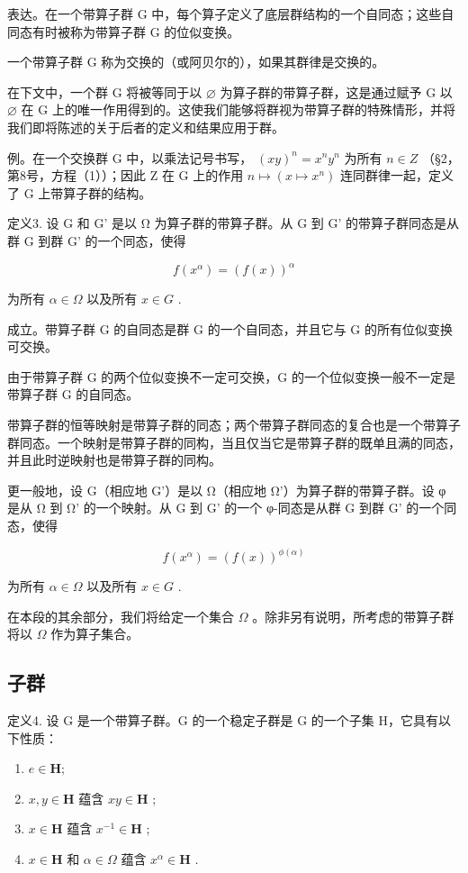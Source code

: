 表达。在一个带算子群 G 中，每个算子定义了底层群结构的一个自同态；这些自同态有时被称为带算子群 G 的位似变换。

一个带算子群 G 称为交换的（或阿贝尔的），如果其群律是交换的。

在下文中，一个群 G 将被等同于以 \(\varnothing\) 为算子群的带算子群，这是通过赋予 G 以 \(\varnothing\) 在 G 上的唯一作用得到的。这使我们能够将群视为带算子群的特殊情形，并将我们即将陈述的关于后者的定义和结果应用于群。

例。在一个交换群 G 中，以乘法记号书写， \((xy)^{n} = x^{n}y^{n}\) 为所有 \(n \in Z\) （§2，第8号，方程（1））；因此 Z 在 G 上的作用 \(n \mapsto (x \mapsto x^{n})\) 连同群律一起，定义了 G 上带算子群的结构。

定义3. 设 G 和 G' 是以 Ω 为算子群的带算子群。从 G 到 G' 的带算子群同态是从群 G 到群 G' 的一个同态，使得

\[
f (x ^ {\alpha}) = (f (x)) ^ {\alpha}
\]

为所有 \(\alpha \in \Omega\) 以及所有 \(x \in G\) .

成立。带算子群 G 的自同态是群 G 的一个自同态，并且它与 G 的所有位似变换可交换。

由于带算子群 G 的两个位似变换不一定可交换，G 的一个位似变换一般不一定是带算子群 G 的自同态。

带算子群的恒等映射是带算子群的同态；两个带算子群同态的复合也是一个带算子群同态。一个映射是带算子群的同构，当且仅当它是带算子群的既单且满的同态，并且此时逆映射也是带算子群的同构。

更一般地，设 G（相应地 G'）是以 Ω（相应地 Ω'）为算子群的带算子群。设 φ 是从 Ω 到 Ω' 的一个映射。从 G 到 G' 的一个 φ-同态是从群 G 到群 G' 的一个同态，使得

\[
f (x ^ {\alpha}) = (f (x)) ^ {\phi (\alpha)}
\]

为所有 \(\alpha \in \Omega\) 以及所有 \(x \in G\) .

在本段的其余部分，我们将给定一个集合 \(\Omega\) 。除非另有说明，所考虑的带算子群将以 \(\Omega\) 作为算子集合。

\subsection{子群}

定义4. 设 G 是一个带算子群。G 的一个稳定子群是 G 的一个子集 H，它具有以下性质：

\begin{enumerate}
\def\labelenumi{(\roman{enumi})}
\item
  \(e\in \mathbf{H};\)
\item
  \(x, y \in \mathbf{H}\) 蕴含 \(xy \in \mathbf{H}\) ;
\item
  \(x \in \mathbf{H}\) 蕴含 \(x^{-1} \in \mathbf{H}\) ;
\item
  \(x \in \mathbf{H}\) 和 \(\alpha \in \Omega\) 蕴含 \(x^{\alpha} \in \mathbf{H}\) .
\end{enumerate}


